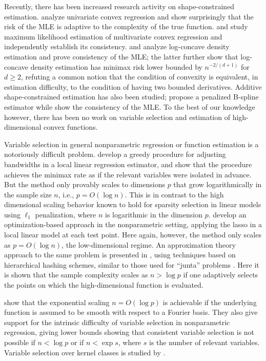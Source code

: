 Recently, there has been increased research activity on
shape-constrained estimation. \citet{guntusen:13} analyze univariate
convex regression and show surprisingly that the risk of the MLE is
adaptive to the complexity of the true
function. \citet{seijo2011nonparametric} and \citet{Lim:12} study
maximum likelihood estimation of multivariate convex regression and
independently establish its consistency. \citet{Cule:10} and
\citet{kim2014global} analyze log-concave density estimation and prove
consistency of the MLE; the latter further show that log-concave
density estimation has minimax risk lower bounded by $n^{-2/(d+1)}$
for $d \geq 2$, refuting a common notion that the condition of
convexity is equivalent, in estimation difficulty, to the condition of
having two bounded derivatives. Additive shape-constrained estimation
has also been studied; \citet{pya2014shape} propose a penalized
B-spline estimator while \citet{chen2014generalised} show the
consistency of the MLE. To the best of our knowledge however, there
has been no work on variable selection and estimation of
high-dimensional convex functions.


Variable selection in general nonparametric regression or function
estimation is a notoriously difficult problem. \citet{lafferty2008rodeo} develop a greedy procedure for
adjusting bandwidths in a local linear regression estimator,
and show that the procedure achieves the minimax rate
as if the relevant variables were isolated in advance.
But the method only provably scales to dimensions $p$ that 
grow logarithmically in the sample size $n$, i.e., $p = O(\log n)$.  This
is in contrast to the high dimensional scaling behavior
known to hold for sparsity selection in linear models
using $\ell_1$ penalization, where $n$
is logarithmic in the dimension $p$. \citet{bertin:08}
develop an optimization-based approach in
the nonparametric setting, applying the lasso
in a local linear model at each test point.  Here again,
however, the method only scales as $p = O(\log n)$,
the low-dimensional regime.
An approximation theory approach to the same
problem is presented in \cite{devore:11}, 
using techniques based on hierarchical hashing schemes,
similar to those used for ``junta'' problems \citep{mossel:04}.
Here it is shown that the sample complexity scales as $n > \log p$ 
if one adaptively selects the points on
which the high-dimensional function is evaluated.

\citet{dalalyan:12} show that the exponential scaling $n=O(\log p)$ is
achievable if the underlying function is assumed to be smooth with
respect to a Fourier basis. They also give support for the intrinsic
difficulty of variable selection in nonparametric regression, giving
lower bounds showing that consistent variable selection is not
possible if $n < \log p$ or if $n < \exp s$, where $s$ is the number
of relevant variables.  Variable selection over kernel classes is
studied by \citet{Kolch:10}.

